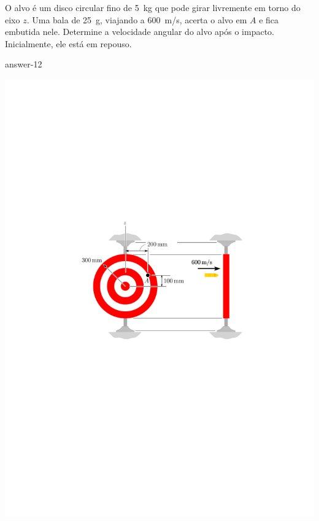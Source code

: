 \item  O alvo é um disco circular fino de \SI{5}{\kilogram} que pode girar livremente em torno do eixo $z$. Uma bala de \SI{25}{\gram}, viajando a \SI{600}{\meter/\second}, acerta o alvo em $A$ e fica embutida nele. Determine a velocidade angular do alvo após o impacto. Inicialmente, ele está em repouso.

{answer-12}

\vspace{-.4cm}
\begin{flushright}
	\includegraphics[scale=1.1]{../../images/draw_8}
\end{flushright}
